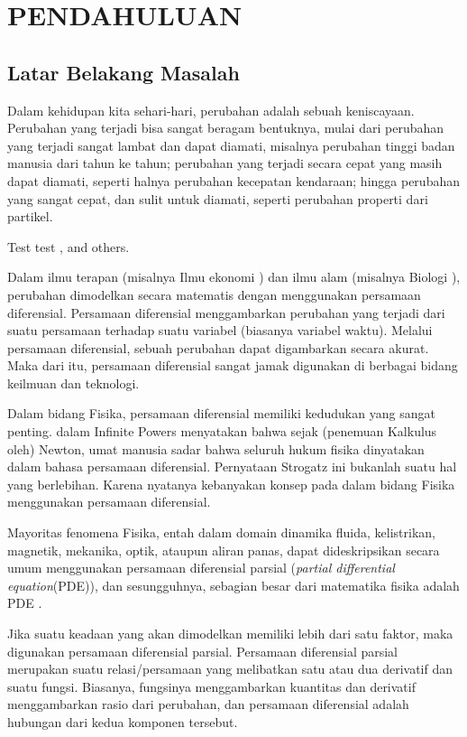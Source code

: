 \chapter{PENDAHULUAN}
\setcounter{page}{1}
\section{Latar Belakang Masalah}
\label{latarbelakang}

Dalam kehidupan kita sehari-hari, perubahan adalah sebuah keniscayaan. Perubahan
yang terjadi bisa sangat beragam bentuknya, mulai dari perubahan yang terjadi sangat
lambat dan dapat diamati, misalnya perubahan tinggi badan manusia dari tahun ke
tahun; perubahan yang terjadi secara cepat yang masih dapat diamati, seperti
halnya perubahan kecepatan kendaraan; hingga perubahan yang sangat cepat, dan
sulit untuk diamati, seperti perubahan properti dari partikel.

Test test \cite{alfarizi_2023_powerranger}, and others.

Dalam ilmu terapan (misalnya Ilmu ekonomi \citep{norberg_1995}) dan ilmu alam (misalnya
Biologi \citep{culshaw_ruan_2000}), perubahan dimodelkan secara matematis dengan
menggunakan persamaan diferensial. Persamaan diferensial menggambarkan perubahan
yang terjadi dari suatu persamaan terhadap suatu variabel (biasanya variabel waktu).
Melalui persamaan diferensial, sebuah perubahan dapat digambarkan secara akurat.
Maka dari itu, persamaan diferensial sangat jamak digunakan di berbagai bidang
keilmuan dan teknologi.

Dalam bidang Fisika, persamaan diferensial memiliki kedudukan yang sangat penting.
\cite{strogatz_2020_infinite} dalam Infinite Powers menyatakan bahwa sejak (penemuan
Kalkulus oleh) Newton, umat manusia sadar bahwa seluruh hukum fisika dinyatakan dalam
bahasa persamaan diferensial. Pernyataan Strogatz ini bukanlah suatu hal yang
berlebihan. Karena nyatanya kebanyakan konsep pada dalam bidang Fisika menggunakan
persamaan diferensial.

Mayoritas fenomena Fisika, entah dalam domain dinamika fluida, kelistrikan,
magnetik, mekanika, optik, ataupun aliran panas, dapat dideskripsikan secara
umum menggunakan persamaan diferensial parsial (\emph{partial differential
equation}(PDE)), dan sesungguhnya, sebagian besar dari matematika fisika adalah
PDE \citep{farlow_2012_partial}.

Jika suatu keadaan yang akan dimodelkan memiliki lebih dari satu faktor, maka
digunakan persamaan diferensial parsial. Persamaan diferensial parsial merupakan
suatu relasi/persamaan yang melibatkan satu atau dua derivatif dan suatu fungsi.
Biasanya, fungsinya menggambarkan kuantitas dan derivatif menggambarkan rasio dari
perubahan, dan persamaan diferensial adalah hubungan dari kedua komponen
tersebut.

